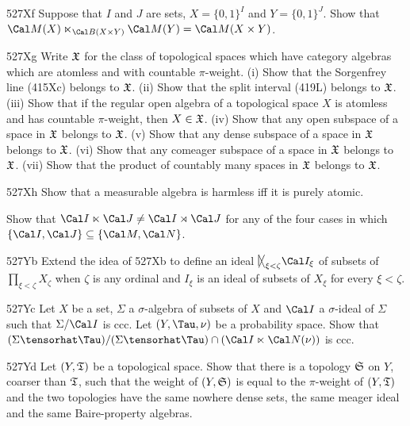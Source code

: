{\sqheader 527Xf Suppose that $I$ and $J$ are sets,
$X=\{0,1\}^I$ and $Y=\{0,1\}^J$.   Show that
$\Cal M(X)\ltimes_{\Cal B(X\times Y)}\Cal M(Y)=\Cal M(X\times Y)$.

\spheader 527Xg Write $\frak X$ for the class of topological spaces
which have category algebras which are atomless and with countable
$\pi$-weight.   (i) Show that the Sorgenfrey line (415Xc)
belongs to $\frak X$.   (ii) Show that the split interval
(419L) belongs to $\frak X$.   (iii) Show that if the regular open
algebra of a topological space $X$ is atomless and has countable
$\pi$-weight, then $X\in\frak X$.   (iv) Show that any open subspace of
a space in $\frak X$ belongs to $\frak X$.   (v) Show that any dense
subspace of a space in $\frak X$ belongs to $\frak X$.
(vi) Show that any comeager subspace of a space in $\frak X$ belongs to
$\frak X$.
(vii) Show that the product of countably many spaces in $\frak X$
belongs to $\frak X$.

\spheader 527Xh Show that a measurable algebra is harmless iff it is purely
atomic.

Show that
$\Cal I\ltimes\Cal J\ne\Cal I\rtimes\Cal J$ for any of the four cases in
which $\{\Cal I,\Cal J\}\subseteq\{\Cal M,\Cal N\}$.

\def\bigltimes{\hbox{$\vrule height9pt width0.5pt depth1.5pt \mskip-1.5mu
          \raise3pt\hbox{$\vee$}\mskip-12mu\raise-3pt\hbox{$\wedge$}$}}

\spheader 527Yb Extend the idea of 527Xb to define an ideal
$\bigltimes_{\xi<\zeta}\Cal I_{\xi}$ of subsets of $\prod_{\xi<\zeta}X_{\zeta}$
when $\zeta$ is any ordinal and $I_{\xi}$ is an ideal of subsets of $X_{\xi}$
for every $\xi<\zeta$.

\spheader 527Yc Let $X$ be a set, $\Sigma$ a $\sigma$-algebra of subsets of $X$ and
$\Cal I$ a $\sigma$-ideal of $\Sigma$ such that $\Sigma/\Cal I$ is ccc.
Let $(Y,\Tau,\nu)$ be a probability space.   Show that
$(\Sigma\tensorhat\Tau)/(\Sigma\tensorhat\Tau)\cap(\Cal I\ltimes\Cal N(\nu))$
is ccc.

\spheader 527Yd Let $(Y,\frak T)$ be a topological space.   Show that there
is a topology $\frak S$ on $Y$, coarser than $\frak T$, such that the
weight of $(Y,\frak S)$ is equal to the $\pi$-weight of $(Y,\frak T)$ and
the two topologies have the same nowhere dense sets, the same meager ideal
and the same Baire-property algebras.

}
